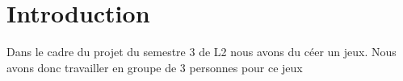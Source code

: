 \hypertarget{index_intro_sec}{}\section{Introduction}\label{index_intro_sec}
Dans le cadre du projet du semestre 3 de L2 nous avons du céer un jeux. Nous avons donc travailler en groupe de 3 personnes pour ce jeux

\par
\par
 